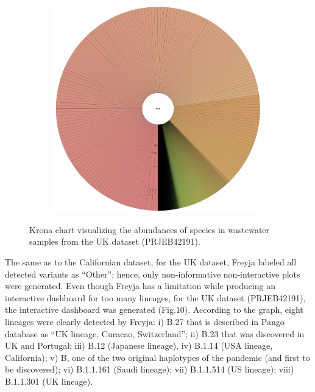 \begin{figure}[H]
\begin{subfigure}[b]{0.3\textwidth}
        \label{fig:results:real:krona-uk-b}
        \end{subfigure}
        \hfill
        \begin{subfigure}[b]{0.3\textwidth}
        \includegraphics[width=1\textwidth]{figures/results/real/krona/krona-uk-all.png}
        \label{fig:results:real:krona-uk-c}
        \end{subfigure}
        \caption{Krona chart visualizing the abundances of species in wastewater samples from the UK dataset (PRJEB42191).}
    \end{figure}
    
    The same as to the Californian dataset, for the UK dataset, Freyja labeled all detected variants as “Other”; hence, only non-informative non-interactive plots were generated. Even though Freyja has a limitation while producing an interactive dashboard for too many lineages, for the UK dataset (PRJEB42191), the interactive dashboard was generated (Fig.10). According to the graph, eight lineages were clearly detected by Freyja: i) B.27 that is described in Pango database as “UK lineage, Curacao, Switzerland”; ii) B.23 that was discovered in UK and Portugal; iii) B.12 (Japanese lineage), iv) B.1.14 (USA lineage, California); v) B, one of the two original haplotypes of the pandemic (and first to be discovered); vi) B.1.1.161 (Saudi lineage); vii) B.1.1.514 (US lineage); viii) B.1.1.301 (UK lineage). 
    
